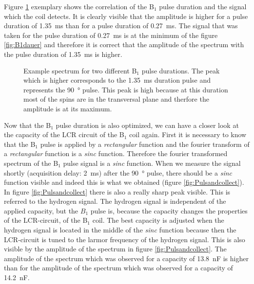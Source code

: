 Figure \ref{fig:pulsedurationbeispiel} exemplary shows the correlation of the B$_1$ pulse duration and the signal which the coil detects.
It is clearly visible that the amplitude is higher for a pulse duration of \SI{1.35}{\milli \second} than for a pulse duration of \SI{0.27}{\milli \second}.
The signal that was taken for the pulse duration of \SI{0.27}{\milli \second} is at the minimum of the figure \ref{fig:B1dauer} and therefore it is correct that the amplitude of the spectrum with the pulse duration of \SI{1.35}{\milli \second} is higher.
\begin{figure}[H]
    \centering
    
    \caption[Example spectrum for two different B$_1$ pulse durations.]{Example spectrum for two different B$_1$ pulse durations.
    The peak which is higher corresponds to the \SI{1.35}{\milli \second} duration pulse and represents the \SI{90}{\degree} pulse.
    This peak is high because at this duration most of the spins are in the transversal plane and therfore the amplitude is at its maximum.}
    \label{fig:pulsedurationbeispiel}
\end{figure}
Now that the B$_1$ pulse duration is also optimized, we can have a closer look at the capacity of the LCR circuit of the B$_1$ coil again.
First it is necessary to know that the B$_1$ pulse is applied by a \textit{rectangular} function and the fourier transform of a \textit{rectangular} function is a \textit{sinc} function.
Therefore the fourier transformed spectrum of the B$_1$ pulse signal is a \textit{sinc} function.
When we measure the signal shortly (acquisition delay: \SI{2}{\milli \second}) after the \SI{90}{\degree} pulse, there should be a \textit{sinc} function visible and indeed this is what we obtained (figure \ref{fig:Pulsandcollect}).
In figure \ref{fig:Pulsandcollect} there is also a really sharp peak visible.
This is referred to the hydrogen signal.
The hydrogen signal is independent of the applied capacity, but the $B_1$ pulse is, because the capacity changes the properties of the LCR-circuit, of the B$_1$ coil.
The best capacity is adjusted when the hydrogen signal is located in the middle of the \textit{sinc} function because then the LCR-circuit is tuned to the larmor frequency of the hydrogen signal.
This is also visible by the amplitude of the spectrum in figure \ref{fig:Pulsandcollect}.
The amplitude of the spectrum which was observed for a capacity of \SI{13.8}{\nano \farad} is higher than for the amplitude of the spectrum which was observed for a capacity of \SI{14.2}{\nano \farad}.
